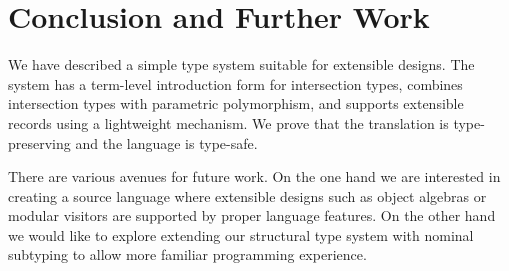\section{Conclusion and Further Work}

We have described a simple type system suitable for extensible designs.
The system has a term-level introduction form for intersection types, combines intersection types with
parametric polymorphism, and supports extensible records using a lightweight
mechanism. We prove that the translation is type-preserving and the language is
type-safe. 

There are various avenues for future work. On the one hand we are
interested in creating a source language where extensible designs such as object
algebras or modular visitors are supported by proper language features. On the
other hand we would like to explore extending our structural type system with
nominal subtyping to allow more familiar programming experience.
